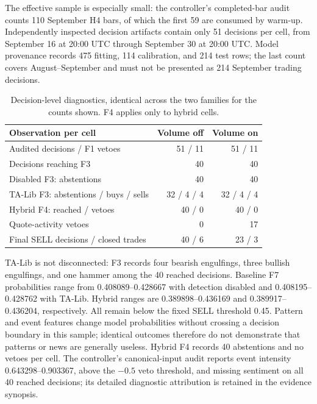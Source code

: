 The effective sample is especially small: the controller's completed-bar audit counts 110 September H4 bars, of which the first 59 are consumed by warm-up. Independently inspected decision artifacts contain only 51 decisions per cell, from September 16 at 20:00 UTC through September 30 at 20:00 UTC. Model provenance records 475 fitting, 114 calibration, and 214 test rows; the last count covers August--September and must not be presented as 214 September trading decisions.

\begin{table}[htbp]
\centering
\caption{Decision-level diagnostics, identical across the two families for the counts shown. F4 applies only to hybrid cells.}
\label{tab:h4-diagnostics}
\small
\begin{tabular}{p{8.4cm}rr}
\toprule
\textbf{Observation per cell} & \textbf{Volume off} & \textbf{Volume on} \\
\midrule
Audited decisions / F1 vetoes & 51 / 11 & 51 / 11 \\
Decisions reaching F3 & 40 & 40 \\
Disabled F3: abstentions & 40 & 40 \\
TA-Lib F3: abstentions / buys / sells & 32 / 4 / 4 & 32 / 4 / 4 \\
Hybrid F4: reached / vetoes & 40 / 0 & 40 / 0 \\
Quote-activity vetoes & 0 & 17 \\
Final SELL decisions / closed trades & 40 / 6 & 23 / 3 \\
\bottomrule
\end{tabular}
\end{table}

TA-Lib is not disconnected: F3 records four bearish engulfings, three bullish engulfings, and one hammer among the 40 reached decisions. Baseline F7 probabilities range from 0.408089--0.428667 with detection disabled and 0.408195--0.428762 with TA-Lib. Hybrid ranges are 0.389898--0.436169 and 0.389917--0.436204, respectively. All remain below the fixed SELL threshold 0.45. Pattern and event features change model probabilities without crossing a decision boundary in this sample; identical outcomes therefore do not demonstrate that patterns or news are generally useless. Hybrid F4 records 40 abstentions and no vetoes per cell. The controller's canonical-input audit reports event intensity 0.643298--0.903367, above the $-0.5$ veto threshold, and missing sentiment on all 40 reached decisions; its detailed diagnostic attribution is retained in the evidence synopsis.

